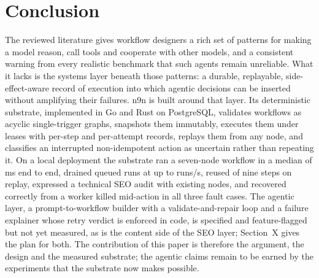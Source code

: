 \documentclass[conference]{IEEEtran}
\begin{document}
\section{Conclusion}
The reviewed literature gives workflow designers a rich set of patterns for making a model reason, call tools and cooperate with other models, and a consistent warning from every realistic benchmark that such agents remain unreliable. What it lacks is the systems layer beneath those patterns: a durable, replayable, side-effect-aware record of execution into which agentic decisions can be inserted without amplifying their failures. n9n is built around that layer. Its deterministic substrate, implemented in Go and Rust on PostgreSQL, validates workflows as acyclic single-trigger graphs, snapshots them immutably, executes them under leases with per-step and per-attempt records, replays them from any node, and classifies an interrupted non-idempotent action as uncertain rather than repeating it. On a local deployment the substrate ran a seven-node workflow in a median of \LATmedian{} ms end to end, drained \THRn{} queued runs at up to \THRbest{} runs/s, reused \REPcopy{} of nine steps on replay, expressed a technical SEO audit with existing nodes, and recovered correctly from a worker killed mid-action in all three fault cases. The agentic layer, a prompt-to-workflow builder with a validate-and-repair loop and a failure explainer whose retry verdict is enforced in code, is specified and feature-flagged but not yet measured, as is the content side of the SEO layer; Section~X gives the plan for both. The contribution of this paper is therefore the argument, the design and the measured substrate; the agentic claims remain to be earned by the experiments that the substrate now makes possible.
\end{document}
